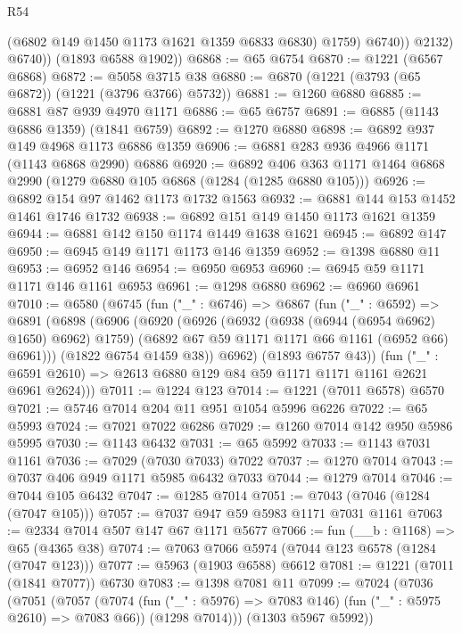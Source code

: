 \begin{lexlean}{R54}
\begin{coremodule}
                  (@6802 @149 @1450 @1173 @1621 @1359 @6833 @6830)
                  @1759)
                @6740))
            @2132)
          @6740))
      (@1893 @6588 @1902))
@6868 := @65 @6754
@6870 := @1221 (@6567 @6868)
@6872 := @5058 @3715 @38
@6880 := @6870 (@1221 (@3793 (@65 @6872)) (@1221 (@3796 @3766) @5732))
@6881 := @1260 @6880
@6885 := @6881 @87 @939 @4970 @1171
@6886 := @65 @6757
@6891 := @6885 (@1143 @6886 @1359) (@1841 @6759)
@6892 := @1270 @6880
@6898 := @6892 @937 @149 @4968 @1173 @6886 @1359
@6906 := @6881 @283 @936 @4966 @1171 (@1143 @6868 @2990) @6886
@6920 := @6892 @406 @363 @1171 @1464 @6868 @2990 (@1279 @6880 @105 @6868 (@1284 (@1285 @6880 @105)))
@6926 := @6892 @154 @97 @1462 @1173 @1732 @1563
@6932 := @6881 @144 @153 @1452 @1461 @1746 @1732
@6938 := @6892 @151 @149 @1450 @1173 @1621 @1359
@6944 := @6881 @142 @150 @1174 @1449 @1638 @1621
@6945 := @6892 @147
@6950 := @6945 @149 @1171 @1173 @146 @1359
@6952 := @1398 @6880 @11
@6953 := @6952 @146
@6954 := @6950 @6953
@6960 := @6945 @59 @1171 @1171 @146 @1161 @6953
@6961 := @1298 @6880
@6962 := @6960 @6961
@7010 := @6580
    (@6745
      (fun ("_" : @6746) =>
      @6867
        (fun ("_" : @6592) =>
        @6891
          (@6898
            (@6906
              (@6920
                (@6926
                  (@6932 (@6938 (@6944 (@6954 @6962) @1650) @6962) @1759)
                  (@6892 @67 @59 @1171 @1171 @66 @1161 (@6952 @66) @6961)))
              (@1822 @6754 @1459 @38))
            @6962)
          (@1893 @6757 @43))
        (fun ("_" : @6591 @2610) => @2613 @6880 @129 @84 @59 @1171 @1171 @1161 @2621 @6961 @2624)))
@7011 := @1224 @123
@7014 := @1221 (@7011 @6578) @6570
@7021 := @5746 @7014 @204 @11 @951 @1054 @5996 @6226
@7022 := @65 @5993
@7024 := @7021 @7022 @6286
@7029 := @1260 @7014 @142 @950 @5986 @5995
@7030 := @1143 @6432
@7031 := @65 @5992
@7033 := @1143 @7031 @1161
@7036 := @7029 (@7030 @7033) @7022
@7037 := @1270 @7014
@7043 := @7037 @406 @949 @1171 @5985 @6432 @7033
@7044 := @1279 @7014
@7046 := @7044 @105 @6432
@7047 := @1285 @7014
@7051 := @7043 (@7046 (@1284 (@7047 @105)))
@7057 := @7037 @947 @59 @5983 @1171 @7031 @1161
@7063 := @2334 @7014 @507 @147 @67 @1171 @5677
@7066 := fun (__b : @1168) => @65 (@4365 @38)
@7074 := @7063 @7066 @5974 (@7044 @123 @6578 (@1284 (@7047 @123)))
@7077 := @5963 (@1903 @6588) @6612
@7081 := @1221 (@7011 (@1841 @7077)) @6730
@7083 := @1398 @7081 @11
@7099 := @7024
    (@7036
      (@7051
        (@7057
          (@7074 (fun ("_" : @5976) => @7083 @146) (fun ("_" : @5975 @2610) => @7083 @66))
          (@1298 @7014)))
      (@1303 @5967 @5992))

\end{coremodule}
\end{lexlean}
